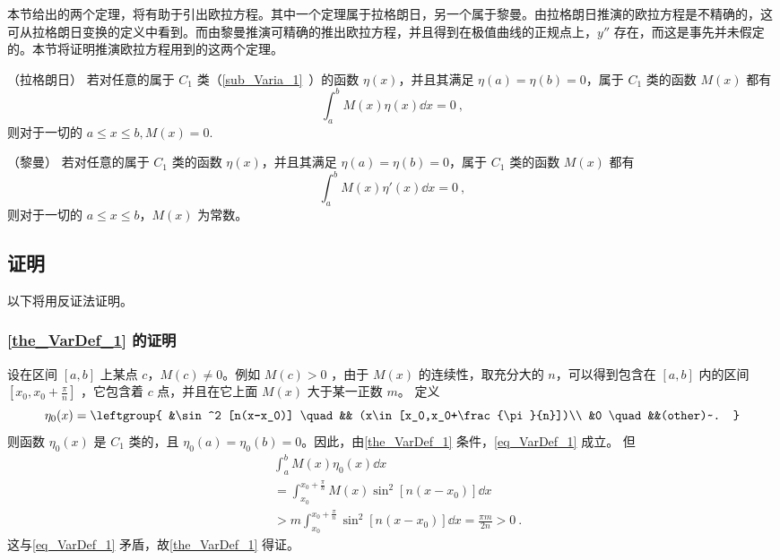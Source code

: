 

本节给出的两个定理，将有助于引出欧拉方程。其中一个定理属于拉格朗日，另一个属于黎曼。由拉格朗日推演的欧拉方程是不精确的，这可从拉格朗日变换的定义中看到。而由黎曼推演可精确的推出欧拉方程，并且得到在极值曲线的正规点上，$y''$ 存在，而这是事先并未假定的。本节将证明推演欧拉方程用到的这两个定理。

\begin{theorem}{（拉格朗日）}\label{the_VarDef_1}
若对任意的属于 $C_1$ 类（\autoref{sub_Varia_1}~）的函数 $\eta(x)$，并且其满足 $\eta(a)=\eta(b)=0$，属于 $C_1$ 类的函数 $M(x)$ 都有
\begin{equation}\label{eq_VarDef_1}
\int_a^b M(x)\eta(x)\dd x=0~,
\end{equation}
则对于一切的 $a\leq x\leq b,M(x)=0$.
\end{theorem}
\begin{theorem}{（黎曼）}\label{the_VarDef_2}
若对任意的属于 $C_1$ 类的函数 $\eta(x)$，并且其满足 $\eta(a)=\eta(b)=0$，属于 $C_1$ 类的函数 $M(x)$ 都有
\begin{equation}\label{eq_VarDef_2}
\int_a^b M(x)\eta'(x)\dd x=0~,
\end{equation}
则对于一切的 $a\leq x\leq b$，$M(x)$ 为常数。
\end{theorem}
\subsection{证明}
以下将用反证法证明。
\subsubsection{\autoref{the_VarDef_1} 的证明}
设在区间 $[a,b]$  上某点 $c$，$M(c)\neq0$。例如 $M(c)>0$ ，由于 $M(x)$ 的连续性，取充分大的 $n$，可以得到包含在 $[a,b]$ 内的区间 $[x_0,x_0+\frac{\pi}{n}]$ ，它包含着 $c$ 点，并且在它上面 $M(x)$ 大于某一正数 $m$。
定义
\begin{equation}
\eta_0(x)=\leftgroup{
&\sin^2 [n(x-x_0)] \quad && (x\in [x_0,x_0+\frac{\pi}{n}])\\
&0 \quad &&(other)~.
}\end{equation}
则函数 $\eta_0(x)$ 是 $C_1$ 类的，且 $\eta_0(a)=\eta_0(b)=0$。因此，由\autoref{the_VarDef_1} 条件，\autoref{eq_VarDef_1} 成立。
但
\begin{equation}
\begin{aligned}
&\int_a^b M(x)\eta_0(x)\dd x\\
&=\int_{x_0}^{x_0+\frac{\pi}{n}}M(x)\sin^2[n(x-x_0)]\dd x\\
&>m\int_{x_0}^{x_0+\frac{\pi}{n}}\sin^2[n(x-x_0)]\dd x=\frac{\pi m}{2n}>0~.
\end{aligned}
\end{equation}
这与\autoref{eq_VarDef_1} 矛盾，故\autoref{the_VarDef_1} 得证。
